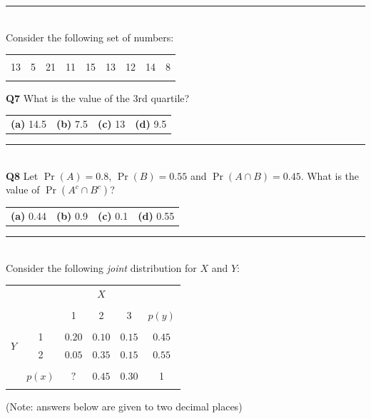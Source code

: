 \documentclass[12pt]{article}
\begin{document}
\rule{\linewidth}{1pt}
\quad\\
Consider the following set of numbers:
\begin{center}
\begin{tabular}{|ccccccccc|}
\hline
&&&&&&&&\\[-0.4cm]
13 & 5 & 21 & 11 & 15 & 13 & 12 & 14 & 8 \\
\hline
\multicolumn{9}{c}{}
\end{tabular}
\end{center}

{\bf Q7} What is the value of the 3rd quartile?\\[0.2cm]
\begin{tabular}{cccc}
{\bf(a)} 14.5 & {\bf(b)} 7.5 & {\bf(c)} 13 & {\bf(d)} 9.5 \\[0.6cm]
\end{tabular}

\rule{\linewidth}{1pt}
\quad\\
{\bf Q8} Let $\Pr(A) = 0.8$, $\Pr(B) = 0.55$ and $\Pr(A \cap B) = 0.45$. What is the value of $\Pr(A^c \cap B^c)$? \\[0.2cm]
\begin{tabular}{cccc}
{\bf(a)} 0.44 & {\bf(b)} 0.9 & {\bf(c)} 0.1 & {\bf(d)} 0.55 \\[0.6cm]
\end{tabular}


\rule{\linewidth}{1pt}
\quad\\
Consider the following \emph{joint} distribution for $X$ and $Y$:
\begin{center}
\begin{tabular}{c|c|ccc|c|}
\multicolumn{2}{c}{} & \multicolumn{3}{c}{$X$} & \multicolumn{1}{c}{}\\
\cline{2-6}
&&&&&\\[-0.4cm]
&&                          1 & 2 & 3 & $p(y)$\\
\cline{2-6}
&&&&&\\[-0.3cm]
\multirow{2}{*}{$Y$} & 1 & $0.20$ &  $0.10$  & $0.15$ & $0.45$ \\[0.1cm]
                     & 2 & $0.05$ &  $0.35$  & $0.15$ & $0.55$ \\[0.1cm]
\cline{2-6}
&&&&&\\[-0.3cm]
& $p(x)$ & $?$ & $0.45$ & $0.30$ & 1 \\[0.1cm]
\cline{2-6}
\multicolumn{6}{c}{}\\[-0.4cm]
\end{tabular}
\end{center}
{\footnotesize(Note: answers below are given to two decimal places)}\\[-0.1cm]
\end{document}
